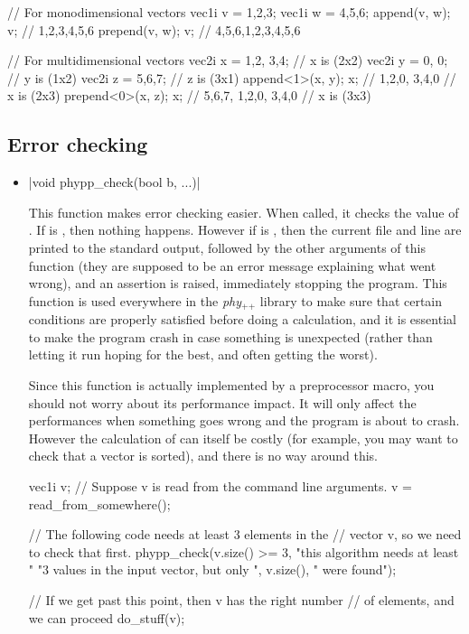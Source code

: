 \documentclass[12pt]{report}
\newcommand{\phypp}{\textit{phy}$_{\text{++}}$\xspace}
\newenvironment{example}
{
    \begin{mdframed}[style=example,frametitle={Example}]
}
{
    \end{mdframed}
}
\newcommand{\cpptrue}{\cppinline{true}\xspace}
\newcommand{\cppfalse}{\cppinline{false}\xspace}
\begin{document}
\begin{itemize}
\begin{example}
\begin{cppcode}
// For monodimensional vectors
vec1i v = {1,2,3};
vec1i w = {4,5,6};
append(v, w);
v; // {1,2,3,4,5,6}
prepend(v, w);
v; // {4,5,6,1,2,3,4,5,6}

// For multidimensional vectors
vec2i x = {{1,2}, {3,4}};         // x is (2x2)
vec2i y = {{0}, {0}};             // y is (1x2)
vec2i z = {{5,6,7}};              // z is (3x1)
append<1>(x, y);
x; // {{1,2,0}, {3,4,0}}          // x is (2x3)
prepend<0>(x, z);
x; // {{5,6,7}, {1,2,0}, {3,4,0}} // x is (3x3)
\end{cppcode}
\end{example}
\end{itemize}

\subsection{Error checking}

\begin{itemize}
\item \cppinline|void phypp_check(bool b, ...)| 

This function makes error checking easier. When called, it checks the value of . If  is \cpptrue, then nothing happens. However if  is \cppfalse, then the current file and line are printed to the standard output, followed by the other arguments of this function (they are supposed to be an error message explaining what went wrong), and an assertion is raised, immediately stopping the program. This function is used everywhere in the \phypp library to make sure that certain conditions are properly satisfied before doing a calculation, and it is essential to make the program crash in case something is unexpected (rather than letting it run hoping for the best, and often getting the worst).

Since this function is actually implemented by a preprocessor macro, you should not worry about its performance impact. It will only affect the performances when something goes wrong and the program is about to crash. However the calculation of  can itself be costly (for example, you may want to check that a vector is sorted), and there is no way around this.

\begin{example}
\begin{cppcode}
vec1i v;
// Suppose v is read from the command line arguments.
v = read_from_somewhere();

// The following code needs at least 3 elements in the
// vector v, so we need to check that first.
phypp_check(v.size() >= 3, "this algorithm needs at least "
    "3 values in the input vector, but only ", v.size(),
    " were found");

// If we get past this point, then v has the right number
// of elements, and we can proceed
do_stuff(v);
\end{cppcode}
\end{example}
\end{itemize}
\end{document}
